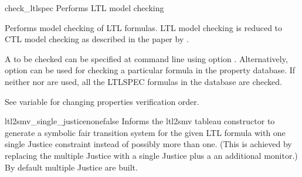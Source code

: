 \begin{nusmvCommand}{check\_ltlspec} {Performs LTL model checking}


Performs model checking of LTL formulas. LTL model checking is reduced
to CTL model checking as described in the paper by \cite{CGH97}.

A \ltlexpr to be checked can be specified at command line
using option  . Alternatively, option  can be used
for checking a particular formula in the property database. If neither
 nor  are used, all the LTLSPEC formulas in the
database are checked.

See variable  for changing properties
verification order.

\begin{cmdOpt}



  

\end{cmdOpt}

\end{nusmvCommand}

\begin{nusmvVar} {ltl2smv\_single\_justice}{none}{false}%
%
Informs the ltl2smv tableau constructor to generate a symbolic fair
transition system for the given LTL formula with one single Justice
constraint instead of possibly more than one. (This is achieved by
replacing the multiple Justice with a single Justice plus a an
additional monitor.) By default multiple Justice are built.
\end{nusmvVar}
